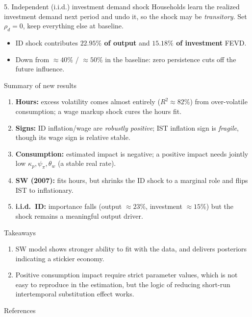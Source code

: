 \documentclass[10pt]{beamer}
\begin{document}
\begin{frame}{5. Independent (i.i.d.) investment demand shock}
	Households learn the realized investment demand next period and undo it, so the shock may be \emph{transitory}. Set $\rho_d=0$, keep everything else at baseline.
	\begin{itemize}
		\item ID shock contributes \textbf{$22.95\%$ of output} and \textbf{$15.18\%$ of investment} FEVD.
		\item Down from $\approx40\%$ / $\approx50\%$ in the baseline: zero persistence cuts off the future influence.
	\end{itemize}
	\vspace{0.2em}
	\centering
	{\scriptsize}
\end{frame}

\begin{frame}{Summary of new results}
	\begin{enumerate}
		\item \textbf{Hours:} excess volatility comes almost entirely ($R^2\approx82\%$) from over-volatile consumption; a wage markup shock cures the hours fit.
		\item \textbf{Signs:} ID inflation/wage are \emph{robustly positive}; IST inflation sign is \emph{fragile}, though its wage sign is relative stable.
		\item \textbf{Consumption:} estimated impact is negative; a positive impact needs jointly low $\kappa_p,\psi_\pi,\theta_w$ (a stable real rate).
		\item \textbf{SW (2007):} fits hours, but shrinks the ID shock to a marginal role and flips IST to inflationary.
		\item \textbf{i.i.d.\ ID:} importance falls (output $\approx23\%$, investment $\approx15\%$) but the shock remains a meaningful output driver.
	\end{enumerate}

	\begin{block}{Takeaways}
		\begin{enumerate}
			\item[\textbf{(i)}] SW model shows stronger ability to fit with the data, and delivers posteriors indicating a stickier economy.
			\item[\textbf{(ii)}] Positive consumption impact require strict parameter values, which is not easy to reproduce in the estimation, but the logic of reducing short-run intertemporal substitution effect works.
		\end{enumerate}
	\end{block}
\end{frame}

\begin{frame}[allowframebreaks]{References}
	
\end{frame}
\end{document}
